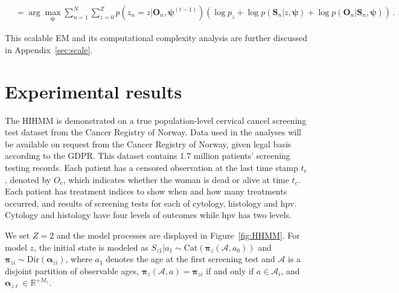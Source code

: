 \documentclass{article}
\begin{document}
\begin{itemize}
\begin{align}
	& =   \arg\max\limits_{\bm{\psi}} \sum_{n = 1}^{N}\sum_{z = 0}^{Z}p(z_n = z| \bm O_n, \bm \psi^{(t-1)})  \left(\log p_z + \log p(\bm S_n | z, \bm \psi) + \log p(\bm O_n| \bm S_n, \bm \psi) \right)\,.
	\label{M_step}
	\end{align}
\end{itemize}

This scalable EM and its computational complexity analysis are further discussed in Appendix~\ref{sec:scale}.


\section{Experimental results}\label{sec:data}
The HIHMM is demonstrated on a true population-level cervical cancel screening test dataset from the Cancer Registry of Norway. Data used in the analyses will be available on request from the Cancer Registry of Norway, given legal basis according to the GDPR. 
This dataset contains 1.7 million patients' screening testing records. Each patient has a censored observation at the last time stamp $t_{c}$, denoted by $O_{c}$, which indicates whether the woman is dead or alive at time $t_c$. Each patient has treatment indices to show when and how many treatments occurred, and results of screening tests for each of cytology, histology and hpv. Cytology and histology have four levels of outcomes while hpv has two levels.

We set $Z = 2$ and the model processes are displayed in Figure~\ref{fig:HHMM}. For model $z$, the initial state is modeled as  
$S_{z1}|a_{1} \sim \mathrm{Cat}(\bm \pi_z(\mathcal{A}, a_0))$ and $\bm \pi_{zi} \sim \mathrm{Dir}(\bm \alpha_{zi})$,
where $a_1$ denotes the age at the first screening test and $\mathcal{A}$ is a disjoint partition of observable ages, $\bm \pi_z(\mathcal{A}, a) = \bm \pi_{zi}$ if and only if $a \in \mathcal{A}_{i}$, and $\bm{\alpha}_{z\ell} \in \mathbb{R}^{+M_z}$.
\end{document}
